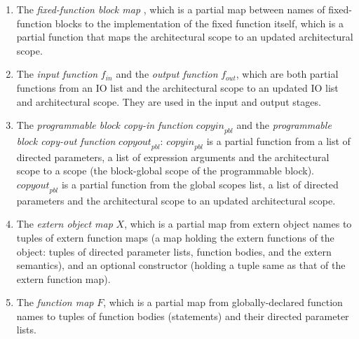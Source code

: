 \documentclass[UTF8]{article}
\begin{document}
\begin{enumerate}
\item The \emph{fixed-function block map} \ffbm{}, which is a partial map between names of fixed-function blocks to the implementation of the fixed function itself, which is a partial function that maps the architectural scope to an updated architectural scope.
\item The \emph{input function} $f_{ \mathit{in} }$ and the \emph{output function} $f_{ \mathit{out} }$, which are both partial functions from an IO list and the architectural scope to an updated IO list and architectural scope. They are used in the input and output stages.
\item The \emph{programmable block copy-in function} $\mathit{copyin}_{ \mathit{pbl} }$ and the \emph{programmable block copy-out function} $\mathit{copyout}_{ \mathit{pbl} }$: $\mathit{copyin}_{ \mathit{pbl} }$ is a partial function from a list of directed parameters, a list of expression arguments and the architectural scope to a scope (the block-global scope of the programmable block). $\mathit{copyout}_{ \mathit{pbl} }$ is a partial function from the global scopes list, a list of directed parameters and the architectural scope to an updated architectural scope.
\item The \emph{extern object map} $X$, which is a partial map from extern object names to tuples of extern function maps (a map holding the extern functions of the object: tuples of directed parameter lists, function bodies, and the extern semantics), and an optional constructor (holding a tuple same as that of the extern function map).
\item The \emph{function map} $F$, which is a partial map from globally-declared function names to tuples of function bodies (statements) and their directed parameter lists.
\end{enumerate}
\end{document}
